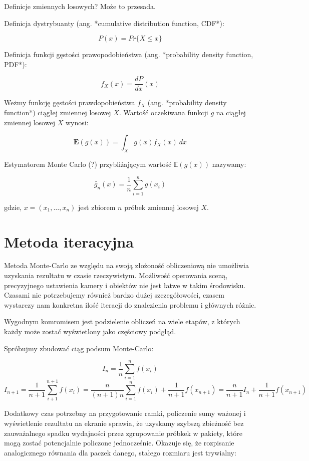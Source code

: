 \documentclass[../main.tex]{subfiles}
\begin{document}
Definicje zmiennych losowych? Może to przesada.

Definicja dystrybuanty (ang. *cumulative distribution function, CDF*):

$$
P(x) = Pr \{ X \leq x \}
$$

Definicja funkcji gęstości prawopodobieństwa (ang. *probability density
function, PDF*):

$$
f_{X}(x) = \frac{dP}{dx}(x)
$$

Weżmy funkcję gęstości prawdopobieństwa $f_X$ (ang. *probability density
function*) ciągłej zmiennej losowej $X$. Wartość oczekiwana funkcji $g$ na
ciągłej zmiennej losowej $X$ wynosi:

$$
\mathbf{E}(g(x)) =
\int_{X}{
    g(x) f_{X}(x)
    \:dx
}
$$

Estymatorem Monte Carlo (?) przybliżającym wartość $\mathbb{E}(g(x))$ nazywamy:

$$
\widetilde{g_n}(x) =
    \frac{1}{n}
    \sum_{i=1}^{n}g(x_i)
$$

gdzie, $x=(x_1, \ldots, x_n)$ jest zbiorem $n$ próbek zmiennej losowej $X$.

\section{Metoda iteracyjna}

Metoda Monte-Carlo ze względu na swoją złożoność obliczeniową nie umożliwia
uzyskania rezultatu w czasie rzeczywistym. Możliwość operowania sceną,
precyzyjnego ustawienia kamery i obiektów nie jest łatwe w takim środowisku.
Czasami nie potrzebujemy również bardzo dużej szczegółowości, czasem wystarczy
nam konkretna ilość iteracji do znalezienia problemu i głównych różnic.

Wygodnym komromisem jest podzielenie obliczeń na wiele etapów, z których każdy
może zostać wyświetlony jako częściowy podgląd.

Spróbujmy zbudować ciąg podsum Monte-Carlo:

$$
I_n = \frac{1}{n} \sum_{i=1}^{n} f(x_i)
$$
$$
I_{n+1} = \frac{1}{n+1} \sum_{i+1}^{n+1}f(x_i)
= \frac{n}{(n+1)n} \sum_{i=1}^{n}f(x_i) + \frac{1}{n+1}f(x_{n+1})
= \frac{n}{n+1} I_{n} + \frac{1}{n+1}f(x_{n+1})
$$

Dodatkowy czas potrzebny na przygotowanie ramki, policzenie sumy ważonej
i wyświetlenie rezultatu na ekranie sprawia, że uzyskamy szybszą zbieżność bez
zauważalnego spadku wydajności przez zgrupowanie próbkek w pakiety, które mogą
zostać potencjalnie policzone jednocześnie. Okazuje się, że rozpisanie
analogicznego równania dla paczek danego, stałego rozmiaru jest trywialny:
\end{document}
